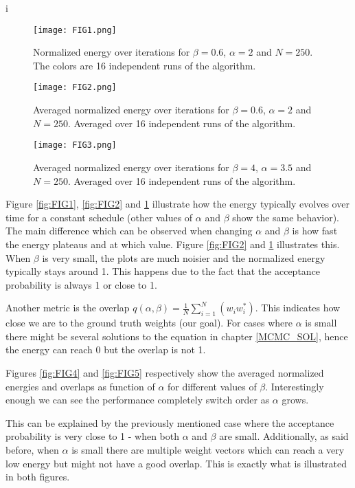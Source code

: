 i\documentclass[a4paper]{article}
\begin{document}
\begin{figure}[!htb]
 \centering
{}
\centering
\texttt{[image: FIG1.png]}
\caption{\label{fig:FIG1}Normalized energy over iterations for $\beta = 0.6$, $\alpha = 2$ and $N = 250$. The colors are 16 independent runs of the algorithm.}
\endminipage\par\medskip
{}
\texttt{[image: FIG2.png]}
\caption{\label{fig:FIG2}Averaged normalized energy over iterations for $\beta = 0.6$, $\alpha = 2$ and $N = 250$. Averaged over 16 independent runs of the algorithm.}
\endminipage\hfill
{}%
\texttt{[image: FIG3.png]}
\caption{\label{fig:FIG3}Averaged normalized energy over iterations for $\beta = 4$, $\alpha = 3.5$ and $N = 250$. Averaged over 16 independent runs of the algorithm.}
\endminipage
\end{figure}


Figure \ref{fig:FIG1}, \ref{fig:FIG2} and \ref{fig:FIG3} illustrate how the energy typically evolves over time for a constant schedule (other values of $\alpha$ and $\beta$ show the same behavior). The main difference which can be observed when changing $\alpha$ and $\beta$ is how fast the energy plateaus and at which value. Figure \ref{fig:FIG2} and \ref{fig:FIG3} illustrates this. When $\beta$ is very small, the plots are much noisier and the normalized energy typically stays around 1. This happens due to the fact that the acceptance probability is always 1 or close to 1.

Another metric is the overlap $q(\alpha, \beta) = \frac{1}{N} \sum_{i = 1}^{N}(w_i w_{i}^{*})$. This indicates how close we are to the ground truth weights (our goal). For cases where $\alpha$ is small there might be several solutions to the equation in chapter \ref{MCMC_SOL}, hence the energy can reach 0 but the overlap is not 1.

Figures \ref{fig:FIG4} and \ref{fig:FIG5} respectively show the averaged normalized energies and overlaps as function of $\alpha$ for different values of $\beta$. Interestingly enough we can see the performance completely switch order as $\alpha$ grows.

This can be explained by the previously mentioned case where the acceptance probability is very close to 1 - when both $\alpha$ and $\beta$ are small. Additionally, as said before, when $\alpha$ is small there are multiple weight vectors which can reach a very low energy but might not have a good overlap. This is exactly what is illustrated in both figures.
\end{document}
